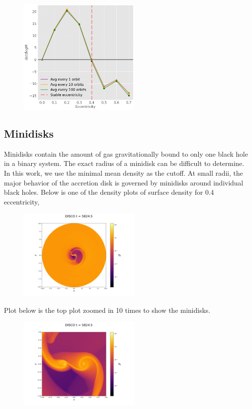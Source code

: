 \documentclass{article}
\begin{document}
\begin{figure}[h]
    \includegraphics[width=6cm]{stable_ecc.png}
    \centering
    \end{figure}


\subsection{Minidisks}
Minidisks contain the amount of gas gravitationally bound to only one black hole in a binary system. The exact radius of a minidisk can be difficult to determine. In this work, we use the minimal mean density as the cutoff.
At small radii, the major behavior of the accretion disk is governed by minidisks around individual black holes. Below is one of the density
 plots of surface density for 0.4 eccentricity, 
 \begin{figure}[h]
    \includegraphics[width=6cm]{plot_eq_0927_log_rho.png}
    \centering
    \end{figure}
 
Plot below is the top plot zoomed in 10 times to show the minidisks.

\begin{figure}[h]
    \includegraphics[width=6cm]{zoom_in.png}
    \centering
    \end{figure}
\end{document}
